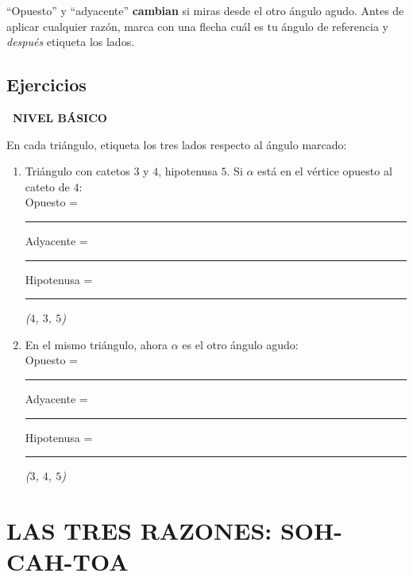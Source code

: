 \documentclass[11pt,a4paper]{article}
\newcommand{\nivelbasico}{%
  \par\smallskip\colorbox{green!60!black}{\color{white}\small\bfseries\ NIVEL BÁSICO\ }\par\smallskip}
\begin{document}
\begin{center}
\end{center}

\begin{tcolorbox}[tip]
``Opuesto'' y ``adyacente'' \textbf{cambian} si miras desde el otro ángulo agudo. Antes de aplicar cualquier razón, marca con una flecha cuál es tu ángulo de referencia y \emph{después} etiqueta los lados.
\end{tcolorbox}

\subsection*{Ejercicios}

\nivelbasico

En cada triángulo, etiqueta los tres lados respecto al ángulo marcado:
\begin{enumerate}[label=\textbf{\arabic*.},leftmargin=1cm,itemsep=8pt]
  \item Triángulo con catetos $3$ y $4$, hipotenusa $5$. Si $\alpha$ está en el vértice opuesto al cateto de $4$: \\
  Opuesto = \rule{1.5cm}{0.4pt} \quad Adyacente = \rule{1.5cm}{0.4pt} \quad Hipotenusa = \rule{1.5cm}{0.4pt}
  \hfill \textit{($4$, $3$, $5$)}

  \item En el mismo triángulo, ahora $\alpha$ es el otro ángulo agudo: \\
  Opuesto = \rule{1.5cm}{0.4pt} \quad Adyacente = \rule{1.5cm}{0.4pt} \quad Hipotenusa = \rule{1.5cm}{0.4pt}
  \hfill \textit{($3$, $4$, $5$)}
\end{enumerate}

\newpage

\section{LAS TRES RAZONES: SOH-CAH-TOA}
\end{document}

